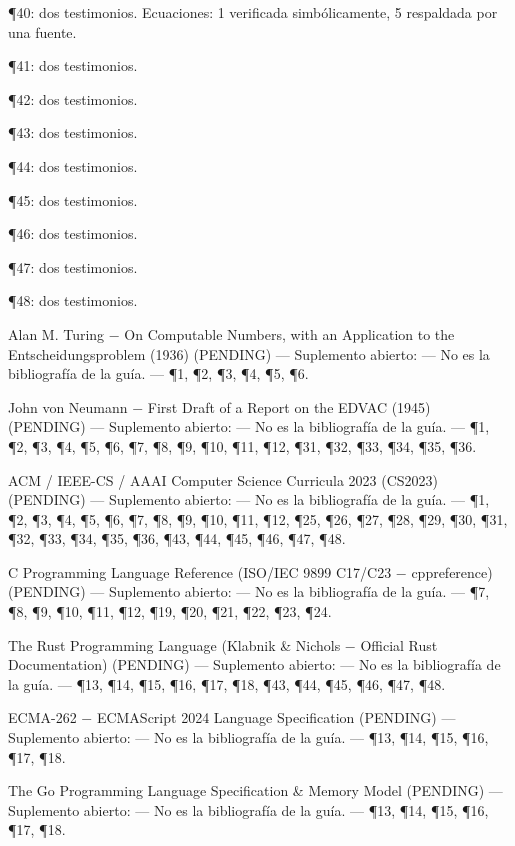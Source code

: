 \documentclass{book}
\begin{document}
\noindent ¶40: dos testimonios. Ecuaciones: 1 verificada simbólicamente, 5 respaldada por una fuente.

\noindent ¶41: dos testimonios.

\noindent ¶42: dos testimonios.

\noindent ¶43: dos testimonios.

\noindent ¶44: dos testimonios.

\noindent ¶45: dos testimonios.

\noindent ¶46: dos testimonios.

\noindent ¶47: dos testimonios.

\noindent ¶48: dos testimonios.

\medskip

\noindent Alan M. Turing \(-\) On Computable Numbers, with an Application to the Entscheidungsproblem (1936) (PENDING) --- Suplemento abierto: --- No es la bibliografía de la guía. --- \P1, \P2, \P3, \P4, \P5, \P6.

\noindent John von Neumann \(-\) First Draft of a Report on the EDVAC (1945) (PENDING) --- Suplemento abierto: --- No es la bibliografía de la guía. --- \P1, \P2, \P3, \P4, \P5, \P6, \P7, \P8, \P9, \P10, \P11, \P12, \P31, \P32, \P33, \P34, \P35, \P36.

\noindent ACM / IEEE-CS / AAAI Computer Science Curricula 2023 (CS2023) (PENDING) --- Suplemento abierto: --- No es la bibliografía de la guía. --- \P1, \P2, \P3, \P4, \P5, \P6, \P7, \P8, \P9, \P10, \P11, \P12, \P25, \P26, \P27, \P28, \P29, \P30, \P31, \P32, \P33, \P34, \P35, \P36, \P43, \P44, \P45, \P46, \P47, \P48.

\noindent C Programming Language Reference (ISO/IEC 9899 C17/C23 \(-\) cppreference) (PENDING) --- Suplemento abierto: --- No es la bibliografía de la guía. --- \P7, \P8, \P9, \P10, \P11, \P12, \P19, \P20, \P21, \P22, \P23, \P24.

\noindent The Rust Programming Language (Klabnik \& Nichols \(-\) Official Rust Documentation) (PENDING) --- Suplemento abierto: --- No es la bibliografía de la guía. --- \P13, \P14, \P15, \P16, \P17, \P18, \P43, \P44, \P45, \P46, \P47, \P48.

\noindent ECMA-262 \(-\) ECMAScript 2024 Language Specification (PENDING) --- Suplemento abierto: --- No es la bibliografía de la guía. --- \P13, \P14, \P15, \P16, \P17, \P18.

\noindent The Go Programming Language Specification \& Memory Model (PENDING) --- Suplemento abierto: --- No es la bibliografía de la guía. --- \P13, \P14, \P15, \P16, \P17, \P18.
\end{document}
